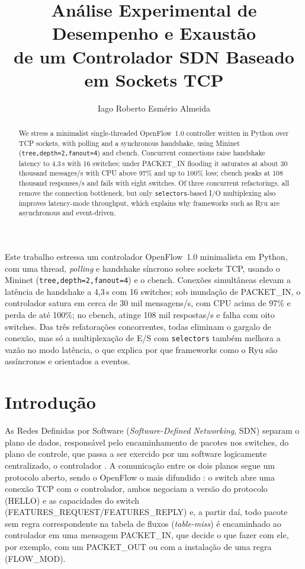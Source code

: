\documentclass[12pt]{article}
\title{Análise Experimental de Desempenho e Exaustão\\de um Controlador SDN Baseado em Sockets TCP}
\author{Iago Roberto Esmério Almeida}
\begin{document}
\maketitle

{\renewcommand{\thefootnote}{}}

\begin{abstract}
We stress a minimalist single-threaded OpenFlow~1.0 controller written in Python over
TCP sockets, with polling and a synchronous handshake, using Mininet
(\texttt{tree,depth=2,fanout=4}) and cbench. Concurrent connections raise handshake
latency to 4.3\,s with 16 switches; under PACKET\_IN flooding it saturates at about
30 thousand messages/s with CPU above 97\% and up to 100\% loss; cbench peaks at
108 thousand responses/s and fails with eight switches. Of three concurrent
refactorings, all remove the connection bottleneck, but only \texttt{selectors}-based
I/O multiplexing also improves latency-mode throughput, which explains why frameworks
such as Ryu are asynchronous and event-driven.
\end{abstract}

\begin{resumo}
Este trabalho estressa um controlador OpenFlow~1.0 minimalista em Python, com uma
thread, \textit{polling} e handshake síncrono sobre sockets TCP, usando o Mininet
(\texttt{tree,depth=2,fanout=4}) e o cbench. Conexões simultâneas elevam a latência de
handshake a 4,3\,s com 16 switches; sob inundação de PACKET\_IN, o controlador satura em
cerca de 30 mil mensagens/s, com CPU acima de 97\% e perda de até 100\%; no cbench,
atinge 108 mil respostas/s e falha com oito switches. Das três refatorações concorrentes,
todas eliminam o gargalo de conexão, mas só a multiplexação de E/S com \texttt{selectors}
também melhora a vazão no modo latência, o que explica por que frameworks como o Ryu são
assíncronos e orientados a eventos.
\end{resumo}

\section{Introdução}
\label{sec:introducao}
As Redes Definidas por Software (\textit{Software-Defined Networking}, SDN) separam o
plano de dados, responsável pelo encaminhamento de pacotes nos switches, do plano de
controle, que passa a ser exercido por um software logicamente centralizado, o
controlador \cite{kreutz2015sdn}. A comunicação entre os dois planos segue um protocolo
aberto, sendo o OpenFlow o mais difundido \cite{mckeown2008openflow,onf2009of10}: o
switch abre uma conexão TCP com o controlador, ambos negociam a versão do protocolo
(HELLO) e as capacidades do switch (FEATURES\_REQUEST/FEATURES\_REPLY) e, a partir daí,
todo pacote sem regra correspondente na tabela de fluxos (\textit{table-miss}) é
encaminhado ao controlador em uma mensagem PACKET\_IN, que decide o que fazer com ele,
por exemplo, com um PACKET\_OUT ou com a instalação de uma regra (FLOW\_MOD).
\end{document}
